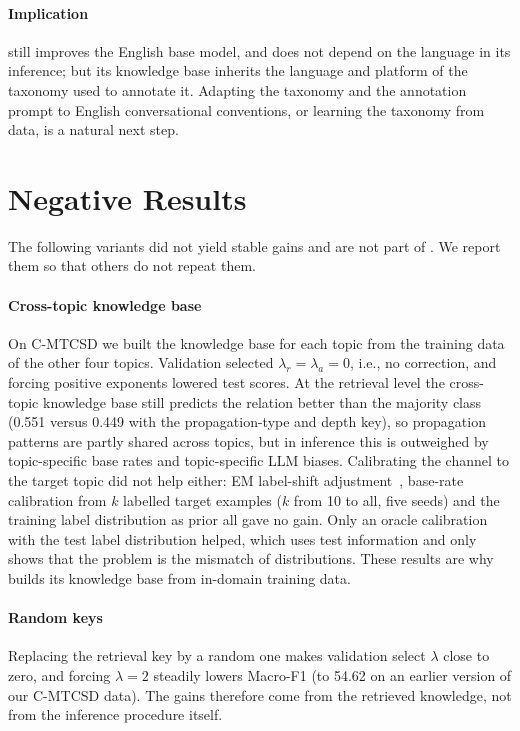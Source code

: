 \paragraph{Implication}
\spin{} still improves the English base model, and does not depend on the language in its inference; but its knowledge base inherits the language and platform of the taxonomy used to annotate it. Adapting the taxonomy and the annotation prompt to English conversational conventions, or learning the taxonomy from data, is a natural next step.

\section{Negative Results}
\label{app:negative}

The following variants did not yield stable gains and are not part of \spin{}. We report them so that others do not repeat them.

\paragraph{Cross-topic knowledge base}
On C-MTCSD we built the knowledge base for each topic from the training data of the other four topics. Validation selected $\lambda_r = \lambda_a = 0$, i.e., no correction, and forcing positive exponents lowered test scores. At the retrieval level the cross-topic knowledge base still predicts the relation better than the majority class (0.551 versus 0.449 with the propagation-type and depth key), so propagation patterns are partly shared across topics, but in inference this is outweighed by topic-specific base rates and topic-specific LLM biases. Calibrating the channel to the target topic did not help either: EM label-shift adjustment~\cite{saerens2002adjusting}, base-rate calibration from $k$ labelled target examples ($k$ from 10 to all, five seeds) and the training label distribution as prior all gave no gain. Only an oracle calibration with the test label distribution helped, which uses test information and only shows that the problem is the mismatch of distributions. These results are why \spin{} builds its knowledge base from in-domain training data.

\paragraph{Random keys}
Replacing the retrieval key by a random one makes validation select $\lambda$ close to zero, and forcing $\lambda = 2$ steadily lowers Macro-F1 (to 54.62 on an earlier version of our C-MTCSD data). The gains therefore come from the retrieved knowledge, not from the inference procedure itself.

